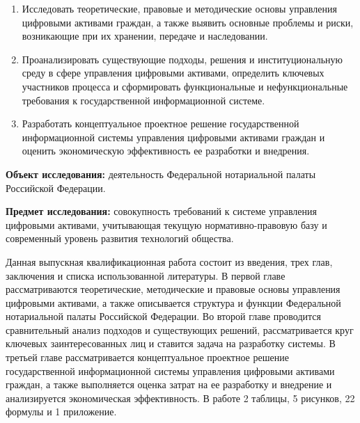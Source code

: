 \begin{enumerate}
\item Исследовать теоретические, правовые и методические основы управления цифровыми активами граждан, а также выявить основные проблемы и риски, возникающие при их хранении, передаче и наследовании.
\item Проанализировать существующие подходы, решения и институциональную среду в сфере управления цифровыми активами, определить ключевых участников процесса и сформировать функциональные и нефункциональные требования к государственной информационной системе.
\item Разработать концептуальное проектное решение государственной информационной системы управления цифровыми активами граждан и оценить экономическую эффективность ее разработки и внедрения.
\end{enumerate}

\textbf{Объект исследования:} деятельность Федеральной нотариальной палаты Российской Федерации.

\textbf{Предмет исследования:} совокупность требований к системе управления цифровыми активами, учитывающая текущую нормативно-правовую базу и современный уровень развития технологий общества.

Данная выпускная квалификационная работа состоит из введения, трех глав, заключения и списка использованной литературы. В первой главе рассматриваются теоретические, методические и правовые основы управления цифровыми активами, а также описывается структура и функции Федеральной нотариальной палаты Российской Федерации. Во второй главе проводится сравнительный анализ подходов и существующих решений, рассматривается круг ключевых заинтересованных лиц и ставится задача на разработку системы. В третьей главе рассматривается концептуальное проектное решение государственной информационной системы управления цифровыми активами граждан, а также выполняется оценка затрат на ее разработку и внедрение и анализируется экономическая эффективность. В работе 2 таблицы, 5 рисунков, 22 формулы и 1 приложение.
